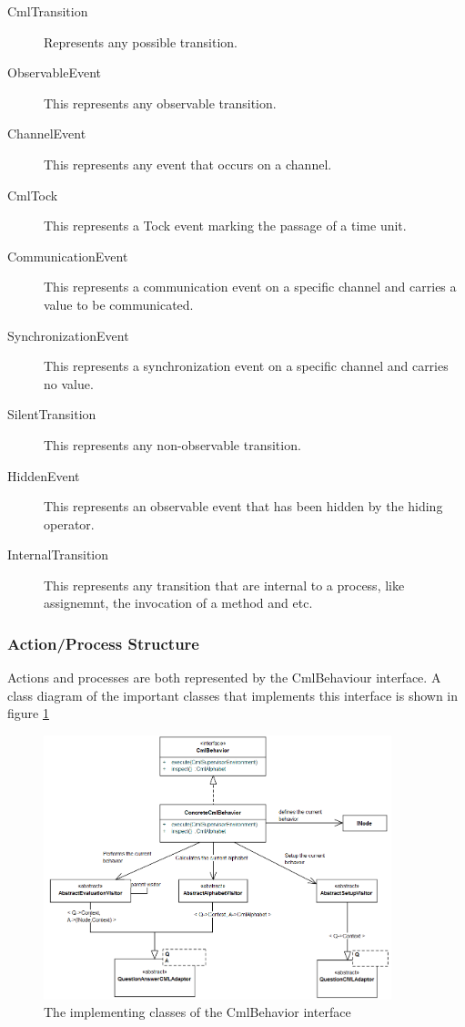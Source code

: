 \documentclass[a4paper, 12pt]{include/compassreport}   %
\begin{document}
\begin{description}
\item[CmlTransition] Represents any possible transition.
\item[ObservableEvent] This represents any observable transition.
\item[ChannelEvent] This represents any event that occurs on a channel.
\item[CmlTock] This represents a Tock event marking the passage of a time unit.
\item[CommunicationEvent] This represents a communication event on a
  specific channel and carries a value to be communicated.
\item[SynchronizationEvent] This represents a synchronization event on
  a specific channel and carries no value.
\item[SilentTransition] This represents any non-observable transition.
\item[HiddenEvent] This represents an observable event that has been hidden by the hiding operator.
\item[InternalTransition] This represents any transition that are
  internal to a process, like assignemnt, the invocation of a method and
  etc.
\end{description}

\subsubsection{Action/Process Structure}
\label{sec:action_process_structure}
Actions and processes are both represented by the CmlBehaviour
interface. A class diagram of the important classes that implements
this interface is shown in figure \ref{fig:cmlbehaviors}
\begin{figure}[ht!]
  \begin{center}
    \includegraphics[width=0.9\textwidth]{figures/CmlBehaviors}
    \caption{The implementing classes of the CmlBehavior interface}
    \label{fig:cmlbehaviors}
  \end{center}
\end{figure}
\end{document}
